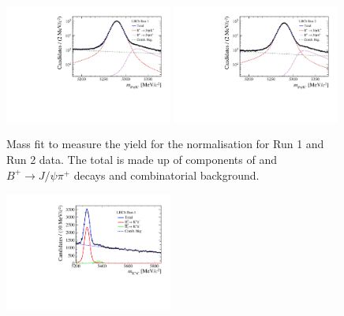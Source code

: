 {{\begin{figure}[tbp]
    \centering
        \includegraphics[width=  0.49\textwidth]{./Figs/BFAnalysis/BuJpsiK_Run1.pdf}
       \includegraphics[width=0.49\textwidth]{./Figs/BFAnalysis/BuJpsiK_Run2.pdf}
    \caption{ Mass fit to measure the \bujpsik yield for the normalisation for Run 1 and Run 2 data. The total \pdf is made up of components of \bujpsik and $B^{+} \to J/\psi \pi^{+}$ decays and combinatorial background.}
    \label{fig:Bujpsikyield}
\end{figure}
\begin{figure}[tbp]
    \centering
        \includegraphics[width=  0.49\textwidth]{./Figs/BFAnalysis/Bd2KPi_mass_RunI_BDTbinNone.pdf}

\end{figure}}}
